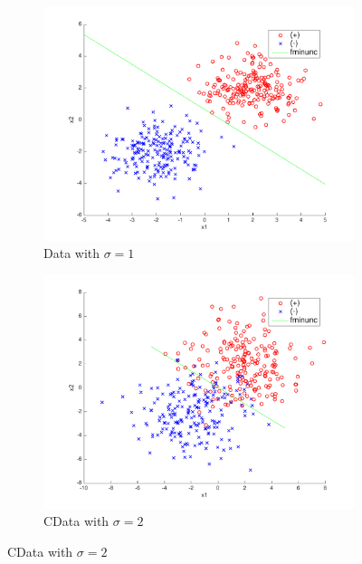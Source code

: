 \begin{figure}[h!]
\centering
    \begin{subfigure}[b]{0.4\textwidth}
	\includegraphics[scale=0.4]{hw2_11.pdf}
	\caption{Data with $\sigma = 1$}\label{fig:data_stdev1}
    \end{subfigure}
    \quad
    \begin{subfigure}[b]{0.4\textwidth}
	\includegraphics[scale=0.4]{hw2_12.pdf}
	\caption{CData with $\sigma = 2$}\label{fig:data_stdev2}
	\end{subfigure}
	
    \quad
    

\end{figure}
